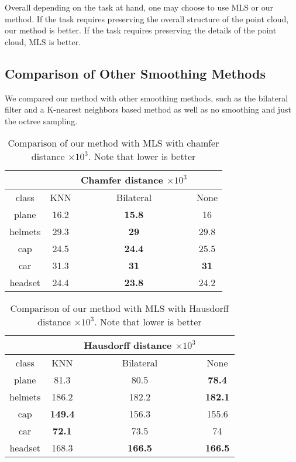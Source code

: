 Overall depending on the task at hand, one may choose to use MLS or our method. If the task requires preserving the overall structure of the point cloud, our method is better. If the task requires preserving the details of the point cloud, MLS is better.

\subsection{Comparison of Other Smoothing Methods}

We compared our method with other smoothing methods, such as the bilateral filter and a K-nearest neighbors based method as well as no smoothing and just the octree sampling.

\begin{table}[H]
\centering
\begin{tabular}{cccc}
	&  & Chamfer distance $\times 10^3$ &\\
	\hline
	class & KNN & Bilateral & None\\
	\hline
	plane & {16.2} & \textbf{15.8} & {16} \\ 
	helmets & {29.3} & \textbf{29} & {29.8} \\
	cap & {24.5} & \textbf{24.4} & {25.5}\\  
	car & {31.3} & \textbf{31} & \textbf{31}\\  
	headset & {24.4} & \textbf{23.8} & {24.2} \\
\end{tabular}
\caption{Comparison of our method with MLS with chamfer distance $\times 10^3$. Note that lower is better}
\end{table}

\begin{table}[H]
\centering
\begin{tabular}{cccc}
	&  & Hausdorff distance $\times 10^3$ &\\
	\hline
	class & KNN & Bilateral & None\\
	\hline
	plane & 81.3 & {80.5} & \textbf{78.4} \\ 
	helmets & 186.2 &  {182.2} & \textbf{182.1}\\
	cap & \textbf{149.4} & {156.3} & {155.6}\\ 
	car & \textbf{72.1} & {73.5} & {74}\\  
	headset & 168.3 & \textbf{166.5} & \textbf{166.5}\\
\end{tabular}
\caption{Comparison of our method with MLS with Hausdorff distance $\times 10^3$. Note that lower is better}
\end{table}


